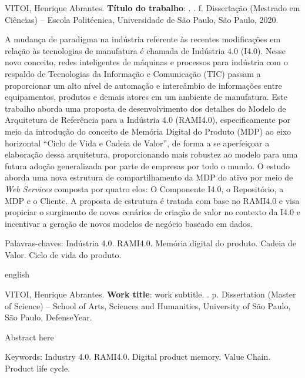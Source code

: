 \setlength{\absparsep}{18pt}	%
\begin{resumo}

	\begin{flushleft}
		VITOI, Henrique Abrantes. \textbf{Título do trabalho}: \imprimirtitulo. \imprimirdata. \pageref{LastPage} f. Dissertação (Mestrado em Ciências) – Escola Politécnica, Universidade de São Paulo, São Paulo, 2020.
	\end{flushleft}

	A mudança de paradigma na indústria referente às recentes modificações em relação às tecnologias de manufatura é chamada de Indústria 4.0 (I4.0). Nesse novo conceito, redes inteligentes de máquinas e processos para indústria com o respaldo de Tecnologias da Informação e Comunicação (TIC) passam a proporcionar um alto nível de automação e intercâmbio de informações entre equipamentos, produtos e demais atores em um ambiente de manufatura.
	Este trabalho aborda uma proposta de desenvolvimento dos detalhes do Modelo de Arquitetura de Referência para a Indústria 4.0 (RAMI4.0), especificamente por meio da introdução do conceito de Memória Digital do Produto (MDP) ao eixo horizontal ``Ciclo de Vida e Cadeia de Valor'', de forma a se aperfeiçoar a elaboração dessa arquitetura, proporcionando mais robustez ao modelo para uma futura adoção generalizada por parte de empresas por todo o mundo.
	O estudo aborda uma nova estrutura de compartilhamento da MDP do ativo por meio de \textit{Web Services} composta por quatro elos: O Componente I4.0, o Repositório, a MDP e o Cliente. A proposta de estrutura é tratada com base no RAMI4.0 e visa propiciar o surgimento de novos cenários de criação de valor no contexto da I4.0 e incentivar a geração de novos modelos de negócio baseado em dados.

	Palavras-chaves: Indústria 4.0. RAMI4.0. Memória digital do produto. Cadeia de Valor. Ciclo de vida do produto.
	
\end{resumo}

\begin{resumo}[Abstract]
	\begin{otherlanguage*}{english}

		\begin{flushleft}
			VITOI, Henrique Abrantes. \textbf{Work title}: work subtitle. \imprimirdata. \pageref{LastPage} p. Dissertation (Master of Science) – School of Arts, Sciences and Humanities, University of São Paulo, São Paulo, DefenseYear. 
		\end{flushleft}
		Abstract here

		Keywords: Industry 4.0. RAMI4.0. Digital product memory. Value Chain. Product life cycle. 
	\end{otherlanguage*}
\end{resumo}

